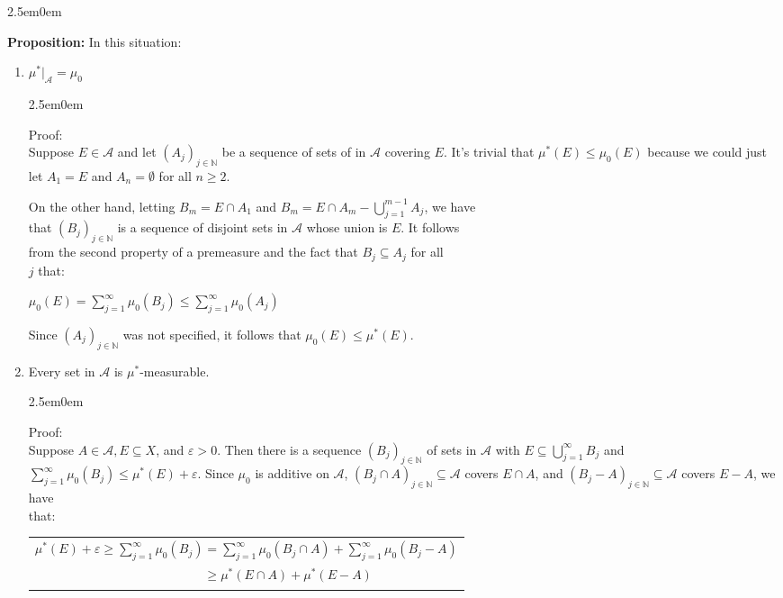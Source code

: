 \documentclass{book}
\newcommand{\hTwo}{%
\color{MidnightBlue}%
   \fontsize{13}{15}\selectfont%
}
\newcommand{\hThree}{%
   \color{PineGreen!85!Orange}
   \fontsize{12}{14}\selectfont%
}
\newenvironment{myIndent}{%
   \begin{adjustwidth}{2.5em}{0em}%
}{%
   \end{adjustwidth}%
}
\newcommand{\blab}[1]{\textbf{#1}}
\newcommand{\retTwo}{\hfill\bigbreak}
\begin{document}
\begin{myIndent}\hTwo
   \blab{Proposition:} In this situation:
   \begin{enumerate}
      \item $\mu^*|_\mathcal{A} = \mu_0$
      \begin{myIndent}\hThree
         Proof:\\
         Suppose $E \in \mathcal{A}$ and let $(A_j)_{j \in \mathbb{N}}$ be a sequence of sets of in $\mathcal{A}$ covering $E$. It's trivial that $\mu^*(E) \leq \mu_0(E)$ because we could just let $A_1 = E$ and $A_n = \emptyset$ for all $n \geq 2$.\newpage
         
         On the other hand, letting $B_m = E \cap A_1$ and $B_m = E \cap A_m - \bigcup\limits_{j = 1}^{m-1}A_j$, we have\\ that $(B_j)_{j \in \mathbb{N}}$ is a sequence of disjoint sets in $\mathcal{A}$ whose union is $E$. It follows\\ [5pt] from the second property of a premeasure and the fact that $B_j \subseteq A_j$ for all\\ [5pt] $j$ that:
         
         {\centering$\mu_0(E) = \sum\limits_{j=1}^\infty \mu_0(B_j) \leq \sum\limits_{j=1}^\infty \mu_0(A_j)$\retTwo\par}
         
         Since $(A_j)_{j \in \mathbb{N}}$ was not specified, it follows that $\mu_0(E) \leq \mu^*(E)$.\retTwo
      \end{myIndent}

      \item Every set in $\mathcal{A}$ is $\mu^*$-measurable.
      \begin{myIndent}\hThree
         Proof:\\
         Suppose $A \in \mathcal{A}, E \subseteq X$, and $\varepsilon > 0$. Then there is a sequence $(B_j)_{j \in \mathbb{N}}$ of sets in $\mathcal{A}$ with $E \subseteq \bigcup\limits_{j=1}^\infty B_j$ and $\sum\limits_{j=1}^\infty \mu_0(B_j) \leq \mu^*(E) + \varepsilon$. Since $\mu_0$ is additive on $\mathcal{A}$, $(B_j \cap A)_{j \in \mathbb{N}} \subseteq \mathcal{A}$ covers $E \cap A$, and $(B_j - A)_{j \in \mathbb{N}} \subseteq \mathcal{A}$ covers $E - A$, we have\\ [5pt] that:

         {\centering 
         \begin{tabular}{l}
            $\mu^*(E) + \varepsilon \geq \sum\limits_{j = 1}^\infty \mu_0(B_j) = \sum\limits_{j = 1}^\infty \mu_0(B_j \cap A) + \sum\limits_{j = 1}^\infty \mu_0(B_j - A)$\\
            $\phantom{\mu^*(E) + \varepsilon \geq \sum\limits_{j = 1}^\infty \mu_0(B_j)} \geq \mu^*(E \cap A) + \mu^*(E - A) $
         \end{tabular} \retTwo\par}


\end{myIndent}
\end{enumerate}
\end{myIndent}
\end{document}
